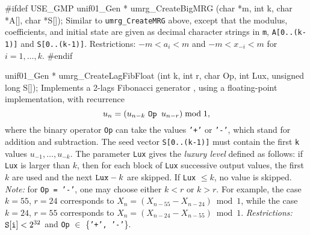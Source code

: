 #ifdef USE_GMP
   unif01_Gen * umrg_CreateBigMRG (char *m, int k, char *A[], char *S[]);
\endcode
 \tab Similar to {\tt umrg\_CreateMRG} above, except that the modulus,
   coefficients, and initial state are given as decimal character strings
   in {\tt m}, {\tt A[0..(k-1)]} and {\tt S[0..(k-1)]}.
   Restrictions:  $-m < a_i < m$ and $-m < x_{-i} < m$ for $i = 1,\dots,k$.
 \endtab
\code
#endif


unif01_Gen * umrg_CreateLagFibFloat (int k, int r, char Op, int Lux,
                                     unsigned long S[]);
\endcode
  \tab Implements a 2-lags Fibonacci generator \cite{rMAR85a,rKNU98a},
  using a floating-point implementation,  
%
  with recurrence
 $$
    u_n = (u_{n-k} \mbox{ \tt Op } u_{n-r}) \bmod 1,
 $$
  where the binary operator {\tt Op} can take the values 
  {\tt '+'} or {\tt '-'}, which stand for addition and subtraction.
  The seed vector {\tt S[0..(k-1)]} must contain the first {\tt k} values 
  $u_{-1},\dots,u_{-k}$.
  The parameter {\tt Lux} gives the {\em luxury level} defined as
  follows: if {\tt Lux} is larger than $k$, 
  then for each block of {\tt Lux} successive output values,
  the first $k$ are used and the next ${\tt Lux} - k$ are skipped.
  If {\tt Lux} $\le k$, no value is skipped. {\em Note:} for {\tt Op = '-'}, 
   one may choose either $k < r$ or $k > r$.  For example, the case
   $k=55$, $r=24$ corresponds to $X_n = (X_{n-55} -  X_{n-24}) \bmod 1$,
   while the case $k=24$, $r=55$ corresponds to $X_n = (X_{n-24} -  X_{n-55})
   \bmod 1$.
  {\em Restrictions:} ${\tt S[i]} < 2^{32}$ and  {\tt Op} $\in$ \{{\tt '+', '-'}\}.
  \endtab
\code


